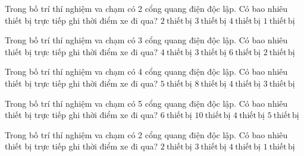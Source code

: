 \begin{ex}
Trong bố trí thí nghiệm va chạm có 2 cổng quang điện độc lập. Có bao nhiêu thiết bị trực tiếp ghi thời điểm xe đi qua?
\choice
{\True $2\ \mathrm{thiết\,bị}$}
{$3\ \mathrm{thiết\,bị}$}
{$4\ \mathrm{thiết\,bị}$}
{$1\ \mathrm{thiết\,bị}$}
\end{ex}

\begin{ex}
Trong bố trí thí nghiệm va chạm có 3 cổng quang điện độc lập. Có bao nhiêu thiết bị trực tiếp ghi thời điểm xe đi qua?
\choice
{$4\ \mathrm{thiết\,bị}$}
{\True $3\ \mathrm{thiết\,bị}$}
{$6\ \mathrm{thiết\,bị}$}
{$2\ \mathrm{thiết\,bị}$}
\end{ex}

\begin{ex}
Trong bố trí thí nghiệm va chạm có 4 cổng quang điện độc lập. Có bao nhiêu thiết bị trực tiếp ghi thời điểm xe đi qua?
\choice
{$5\ \mathrm{thiết\,bị}$}
{$8\ \mathrm{thiết\,bị}$}
{\True $4\ \mathrm{thiết\,bị}$}
{$3\ \mathrm{thiết\,bị}$}
\end{ex}

\begin{ex}
Trong bố trí thí nghiệm va chạm có 5 cổng quang điện độc lập. Có bao nhiêu thiết bị trực tiếp ghi thời điểm xe đi qua?
\choice
{$6\ \mathrm{thiết\,bị}$}
{$10\ \mathrm{thiết\,bị}$}
{$4\ \mathrm{thiết\,bị}$}
{\True $5\ \mathrm{thiết\,bị}$}
\end{ex}

\begin{ex}
Trong bố trí thí nghiệm va chạm có 2 cổng quang điện độc lập. Có bao nhiêu thiết bị trực tiếp ghi thời điểm xe đi qua?
\choice
{\True $2\ \mathrm{thiết\,bị}$}
{$3\ \mathrm{thiết\,bị}$}
{$4\ \mathrm{thiết\,bị}$}
{$1\ \mathrm{thiết\,bị}$}
\end{ex}


